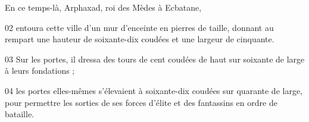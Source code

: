 En ce temps-là, Arphaxad, roi des Mèdes à Ecbatane,

02 entoura cette ville d'un mur d'enceinte en pierres de taille, donnant au rempart une hauteur de soixante-dix coudées et une largeur de cinquante.

03 Sur les portes, il dressa des tours de cent coudées de haut sur soixante de large à leurs fondations ;

04 les portes elles-mêmes s'élevaient à soixante-dix coudées sur quarante de large, pour permettre les sorties de ses forces d'élite et des fantassins en ordre de bataille.
